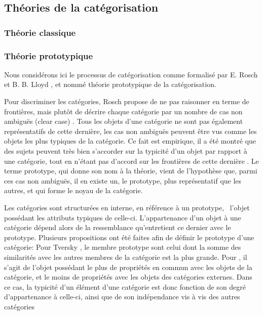 \subsection{Théories de la catégorisation}


\subsubsection{Théorie classique}

\subsubsection{Théorie prototypique}

Nous considérons ici le processus de catégorisation comme formalisé par E. Rosch et B. B. Lloyd \citep{rosch1978cognition}, et nommé théorie prototypique de la catégorisation. 
 
Pour discriminer les catégories, Rosch propose de ne pas raisonner en terme de frontières, mais plutôt de décrire chaque catégorie par un nombre de cas non ambiguës (clear case) \citep[p. 36]{rosch1978cognition}. Tous les objets d'une catégorie ne sont pas également représentatifs de cette dernière, les cas non ambiguës peuvent être vus comme les objets les plus typiques de la catégorie. Ce fait est empirique, il a été montré que des sujets peuvent très bien s'accorder sur la typicité d'un objet par rapport à une catégorie, tout en n'étant pas d'accord sur les frontières de cette dernière \citep{rosch1974human,rosch1975cognitive}. Le terme prototype, qui donne son nom à la théorie, vient de l'hypothèse que, parmi ces cas non ambiguës, il en existe un, le prototype, plus représentatif que les autres, et qui forme le noyau de la catégorie.

Les catégories sont structurées en interne, en référence à un prototype, \ie~l'objet possédant les attributs typiques de celle-ci. L'appartenance d'un objet à une catégorie dépend alors de la ressemblance qu'entretient ce dernier avec le prototype.  Plusieurs propositions ont été faites afin de définir le prototype d'une catégorie: Pour Tversky \citep{tversky1977features}, le membre prototype sont celui dont la somme des similarités avec les autres membres de la catégorie est la plus grande. Pour \citep{rosch1975family}, il s'agit de l'objet possédant le plus de propriétés en commun avec les objets de la catégorie, et le moins de propriétés avec les objets des catégories externes. Dans ce cas, la typicité d'un élément d'une catégorie est donc fonction de son degré d'appartenance à celle-ci, ainsi que de son indépendance vis à vis des autres catégories

